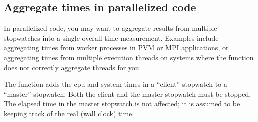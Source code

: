 \subsection{Aggregate times in parallelized code}

In parallelized code, you may want to aggregate results from multiple
stopwatches into a single overall time measurement. Examples include
aggregating times from worker processes in PVM or MPI applications, or
aggregating times from multiple execution threads on systems where the
 function does not correctly aggregate threads for you.

The  function adds the cpu and system
times in a ``client'' stopwatch to a ``master'' stopwatch. Both the
client and the master stopwatch must be stopped. The elapsed time in
the master stopwatch is not affected; it is assumed to be keeping
track of the real (wall clock) time. 




